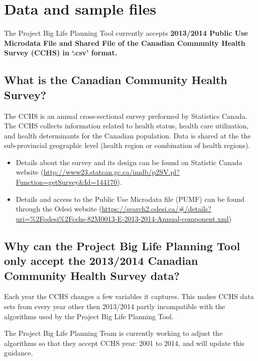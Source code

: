 \documentclass[]{book}
\providecommand{\tightlist}{%
  \setlength{\itemsep}{0pt}\setlength{\parskip}{0pt}}
\begin{document}
\section{Data and sample files}\label{data-and-sample-files}

The Project Big Life Planning Tool currently accepts \textbf{2013/2014
Public Use Microdata File and Shared File of the Canadian Community
Health Survey (CCHS) in `.csv' format.}

\subsection{What is the Canadian Community Health
Survey?}\label{what-is-the-canadian-community-health-survey}

The CCHS is an annual cross-sectional survey preformed by Statistics
Canada. The CCHS collects information related to health status, health
care utilization, and health determinants for the Canadian population.
Data is shared at the the sub-provincial geographic level (health region
or combination of health regions).

\begin{itemize}
\tightlist
\item
  Details about the survey and its design can be found on Statistic
  Canada website
  (\url{http://www23.statcan.gc.ca/imdb/p2SV.pl?Function=getSurvey\&Id=144170}).
\item
  Details and access to the Public Use Microdata file (PUMF) can be
  found through the Odesi website
  (\url{https://search2.odesi.ca/\#/details?uri=\%2Fodesi\%2Fcchs-82M0013-E-2013-2014-Annual-component.xml})
\end{itemize}

\subsection{Why can the Project Big Life Planning Tool only accept the
2013/2014 Canadian Community Health Survey
data?}\label{why-can-the-project-big-life-planning-tool-only-accept-the-20132014-canadian-community-health-survey-data}

Each year the CCHS changes a few variables it captures. This makes CCHS
data sets from every year other then 2013/2014 partly incompatible with
the algorithms used by the Project Big Life Planning Tool.

The Project Big Life Planning Team is currently working to adjust the
algorithms so that they accept CCHS year: 2001 to 2014, and will update
this guidance.
\end{document}
